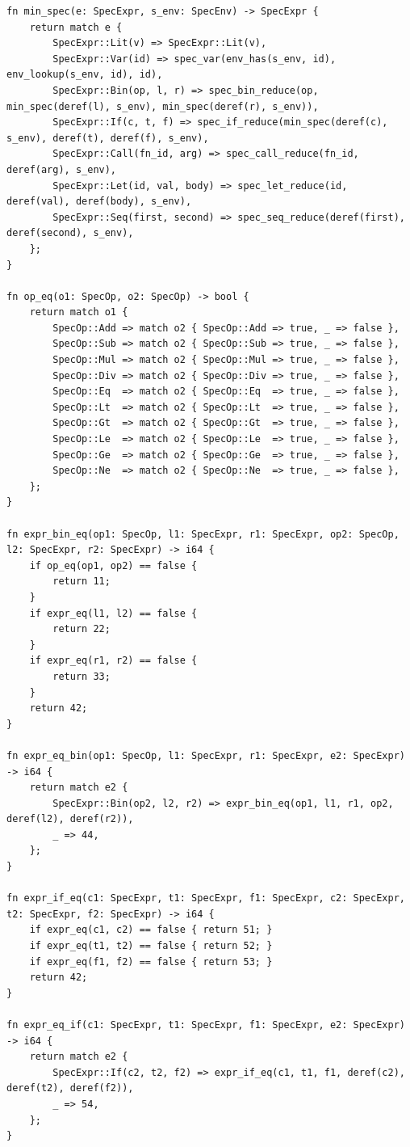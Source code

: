 \begin{lstlisting}[language=NumLang, caption={Full Annotated Source of the NumLang Self-Applicable Specializer (\texttt{src/stdlib/minspec.nl}).}, label={lst:minspec_nl_full}]
fn min_spec(e: SpecExpr, s_env: SpecEnv) -> SpecExpr {
    return match e {
        SpecExpr::Lit(v) => SpecExpr::Lit(v),
        SpecExpr::Var(id) => spec_var(env_has(s_env, id), env_lookup(s_env, id), id),
        SpecExpr::Bin(op, l, r) => spec_bin_reduce(op, min_spec(deref(l), s_env), min_spec(deref(r), s_env)),
        SpecExpr::If(c, t, f) => spec_if_reduce(min_spec(deref(c), s_env), deref(t), deref(f), s_env),
        SpecExpr::Call(fn_id, arg) => spec_call_reduce(fn_id, deref(arg), s_env),
        SpecExpr::Let(id, val, body) => spec_let_reduce(id, deref(val), deref(body), s_env),
        SpecExpr::Seq(first, second) => spec_seq_reduce(deref(first), deref(second), s_env),
    };
}

fn op_eq(o1: SpecOp, o2: SpecOp) -> bool {
    return match o1 {
        SpecOp::Add => match o2 { SpecOp::Add => true, _ => false },
        SpecOp::Sub => match o2 { SpecOp::Sub => true, _ => false },
        SpecOp::Mul => match o2 { SpecOp::Mul => true, _ => false },
        SpecOp::Div => match o2 { SpecOp::Div => true, _ => false },
        SpecOp::Eq  => match o2 { SpecOp::Eq  => true, _ => false },
        SpecOp::Lt  => match o2 { SpecOp::Lt  => true, _ => false },
        SpecOp::Gt  => match o2 { SpecOp::Gt  => true, _ => false },
        SpecOp::Le  => match o2 { SpecOp::Le  => true, _ => false },
        SpecOp::Ge  => match o2 { SpecOp::Ge  => true, _ => false },
        SpecOp::Ne  => match o2 { SpecOp::Ne  => true, _ => false },
    };
}

fn expr_bin_eq(op1: SpecOp, l1: SpecExpr, r1: SpecExpr, op2: SpecOp, l2: SpecExpr, r2: SpecExpr) -> i64 {
    if op_eq(op1, op2) == false {
        return 11;
    }
    if expr_eq(l1, l2) == false {
        return 22;
    }
    if expr_eq(r1, r2) == false {
        return 33;
    }
    return 42;
}

fn expr_eq_bin(op1: SpecOp, l1: SpecExpr, r1: SpecExpr, e2: SpecExpr) -> i64 {
    return match e2 {
        SpecExpr::Bin(op2, l2, r2) => expr_bin_eq(op1, l1, r1, op2, deref(l2), deref(r2)),
        _ => 44,
    };
}

fn expr_if_eq(c1: SpecExpr, t1: SpecExpr, f1: SpecExpr, c2: SpecExpr, t2: SpecExpr, f2: SpecExpr) -> i64 {
    if expr_eq(c1, c2) == false { return 51; }
    if expr_eq(t1, t2) == false { return 52; }
    if expr_eq(f1, f2) == false { return 53; }
    return 42;
}

fn expr_eq_if(c1: SpecExpr, t1: SpecExpr, f1: SpecExpr, e2: SpecExpr) -> i64 {
    return match e2 {
        SpecExpr::If(c2, t2, f2) => expr_if_eq(c1, t1, f1, deref(c2), deref(t2), deref(f2)),
        _ => 54,
    };
}


\end{lstlisting}
